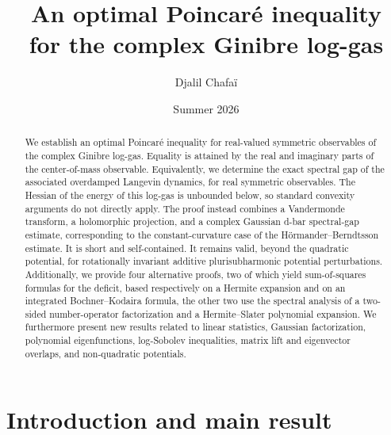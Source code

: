 \documentclass[11pt,reqno]{amsart}
\title[An optimal Poincaré inequality for the complex Ginibre log-gas]{An optimal Poincaré inequality\\for the complex Ginibre log-gas}
\author{Djalil Chafaï}
\date{Summer 2026}
\numberwithin{equation}{section}%
\numberwithin{figure}{section}%
\numberwithin{table}{section}
\theoremstyle{plain}
\theoremstyle{definition}
\begin{document}
%
\begin{abstract}
  We establish an optimal Poincaré inequality for real-valued symmetric
  observables of the complex Ginibre log-gas. Equality is attained by the real
  and imaginary parts of the center-of-mass observable. Equivalently, we
  determine the exact spectral gap of the associated overdamped Langevin
  dynamics, for real symmetric observables. The Hessian of the energy of this
  log-gas is unbounded below, so standard convexity arguments do not directly
  apply. The proof instead combines a Vandermonde transform, a holomorphic
  projection, and a complex Gaussian d-bar spectral-gap estimate,
  corresponding to the constant-curvature case of the Hörmander--Berndtsson
  estimate. It is short and self-contained. It remains valid, beyond the
  quadratic potential, for rotationally invariant additive plurisubharmonic
  potential perturbations. Additionally, we provide four alternative proofs,
  two of which yield sum-of-squares formulas for the deficit, based
  respectively on a Hermite expansion and on an integrated Bochner--Kodaira
  formula, the other two use the spectral analysis of a two-sided
  number-operator factorization and a Hermite--Slater polynomial expansion. We
  furthermore present new results related to linear statistics, Gaussian
  factorization, polynomial eigenfunctions, log-Sobolev inequalities, matrix
  lift and eigenvector overlaps, and non-quadratic potentials.
\end{abstract}
%
\maketitle
%
{\footnotesize\tableofcontents}
%
\section{Introduction and main result}
\end{document}
